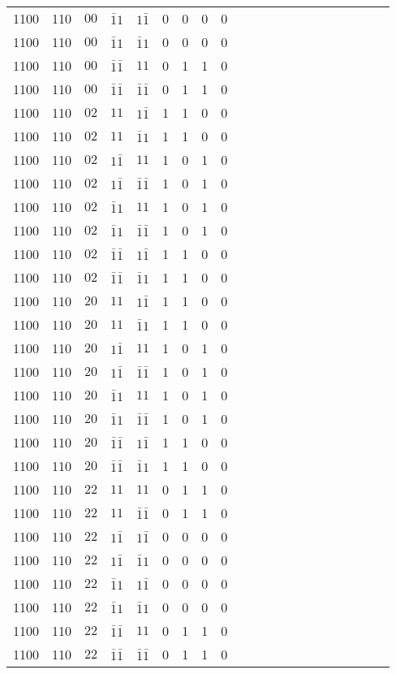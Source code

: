\begin{longtable*}{c| cccccccccccccccccccc }
1100& 110& $00$& $\bar{1}1$& $1\bar{1}$& 0& 0& 0& 0\\
1100& 110& $00$& $\bar{1}1$& $\bar{1}1$& 0& 0& 0& 0\\
1100& 110& $00$& $\bar{1}\bar{1}$& $11$& 0& 1& 1& 0\\
1100& 110& $00$& $\bar{1}\bar{1}$& $\bar{1}\bar{1}$& 0& 1& 1& 0\\
1100& 110& $02$& $11$& $1\bar{1}$& 1& 1& 0& 0\\
1100& 110& $02$& $11$& $\bar{1}1$& 1& 1& 0& 0\\
1100& 110& $02$& $1\bar{1}$& $11$& 1& 0& 1& 0\\
1100& 110& $02$& $1\bar{1}$& $\bar{1}\bar{1}$& 1& 0& 1& 0\\
1100& 110& $02$& $\bar{1}1$& $11$& 1& 0& 1& 0\\
1100& 110& $02$& $\bar{1}1$& $\bar{1}\bar{1}$& 1& 0& 1& 0\\
1100& 110& $02$& $\bar{1}\bar{1}$& $1\bar{1}$& 1& 1& 0& 0\\
1100& 110& $02$& $\bar{1}\bar{1}$& $\bar{1}1$& 1& 1& 0& 0\\
1100& 110& $20$& $11$& $1\bar{1}$& 1& 1& 0& 0\\
1100& 110& $20$& $11$& $\bar{1}1$& 1& 1& 0& 0\\
1100& 110& $20$& $1\bar{1}$& $11$& 1& 0& 1& 0\\
1100& 110& $20$& $1\bar{1}$& $\bar{1}\bar{1}$& 1& 0& 1& 0\\
1100& 110& $20$& $\bar{1}1$& $11$& 1& 0& 1& 0\\
1100& 110& $20$& $\bar{1}1$& $\bar{1}\bar{1}$& 1& 0& 1& 0\\
1100& 110& $20$& $\bar{1}\bar{1}$& $1\bar{1}$& 1& 1& 0& 0\\
1100& 110& $20$& $\bar{1}\bar{1}$& $\bar{1}1$& 1& 1& 0& 0\\
1100& 110& $22$& $11$& $11$& 0& 1& 1& 0\\
1100& 110& $22$& $11$& $\bar{1}\bar{1}$& 0& 1& 1& 0\\
1100& 110& $22$& $1\bar{1}$& $1\bar{1}$& 0& 0& 0& 0\\
1100& 110& $22$& $1\bar{1}$& $\bar{1}1$& 0& 0& 0& 0\\
1100& 110& $22$& $\bar{1}1$& $1\bar{1}$& 0& 0& 0& 0\\
1100& 110& $22$& $\bar{1}1$& $\bar{1}1$& 0& 0& 0& 0\\
1100& 110& $22$& $\bar{1}\bar{1}$& $11$& 0& 1& 1& 0\\
1100& 110& $22$& $\bar{1}\bar{1}$& $\bar{1}\bar{1}$& 0& 1& 1& 0\\

\end{longtable*}

